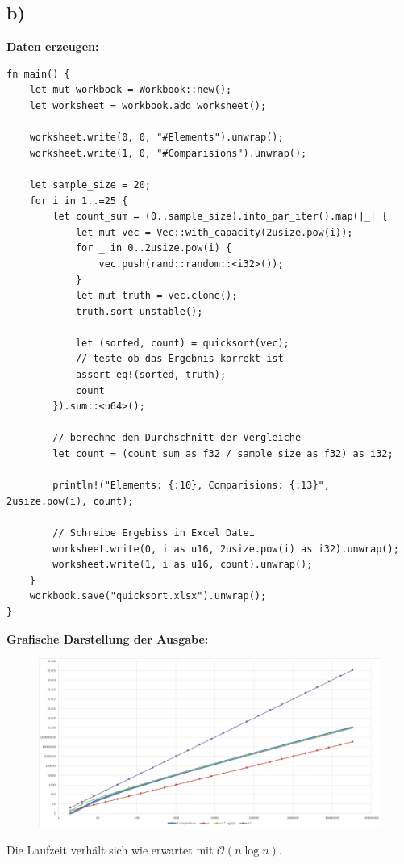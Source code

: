 \documentclass[a4paper]{scrartcl}
\begin{document}
\subsection*{b)}
\textbf{Daten erzeugen:}
\begin{lstlisting}
fn main() {
	let mut workbook = Workbook::new();
	let worksheet = workbook.add_worksheet();

	worksheet.write(0, 0, "#Elements").unwrap();
	worksheet.write(1, 0, "#Comparisions").unwrap();

	let sample_size = 20;
	for i in 1..=25 {
		let count_sum = (0..sample_size).into_par_iter().map(|_| {
			let mut vec = Vec::with_capacity(2usize.pow(i));
			for _ in 0..2usize.pow(i) {
				vec.push(rand::random::<i32>());
			}
			let mut truth = vec.clone();
			truth.sort_unstable();
			
			let (sorted, count) = quicksort(vec);
			// teste ob das Ergebnis korrekt ist
			assert_eq!(sorted, truth);
			count
		}).sum::<u64>();

		// berechne den Durchschnitt der Vergleiche
		let count = (count_sum as f32 / sample_size as f32) as i32;
		
		println!("Elements: {:10}, Comparisions: {:13}", 2usize.pow(i), count);
		
		// Schreibe Ergebiss in Excel Datei
		worksheet.write(0, i as u16, 2usize.pow(i) as i32).unwrap();
		worksheet.write(1, i as u16, count).unwrap();
	}
	workbook.save("quicksort.xlsx").unwrap();
}
\end{lstlisting}

\textbf{Grafische Darstellung der Ausgabe:}
\begin{figure}[H]
	\centering
	\includegraphics[width=1.0\textwidth]{graph.png}
\end{figure}
Die Laufzeit verhält sich wie erwartet mit $\mathcal{O}(n \log n)$.
\end{document}
